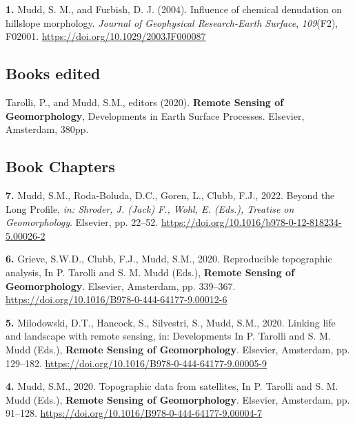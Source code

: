 \documentclass[10pt, a4paper]{article}
\newcommand{\years}[1]{\marginnote{\scriptsize #1}}
\begin{document}
\years{2004}\hangindent=0.7cm\textbf{1. }Mudd, S. M., and Furbish, D. J. (2004). Influence of chemical denudation on hillslope morphology. \textit{Journal of Geophysical Research-Earth Surface}, \textit{109}(F2), F02001. \href{https://doi.org/10.1029/2003JF000087}{https://doi.org/10.1029/2003JF000087}\par


\subsection*{Books edited}
\years{2020}\hangindent=0.7cm Tarolli, P., and Mudd, S.M., editors (2020). \textbf{Remote Sensing of Geomorphology}, Developments in Earth Surface Processes. Elsevier, Amsterdam, 380pp.

\subsection*{Book Chapters}
\noindent
\years{2022}\hangindent=0.7cm\textbf{7. }Mudd, S.M., Roda-Boluda, D.C., Goren, L., Clubb, F.J., 2022. Beyond the Long Profile, \textit{in: Shroder, J. (Jack) F., Wohl, E. (Eds.), Treatise on Geomorphology}. Elsevier, pp. 22–52. \href{https://doi.org/10.1016/b978-0-12-818234-5.00026-2}{https://doi.org/10.1016/b978-0-12-818234-5.00026-2}\par

\years{2020}\hangindent=0.7cm\textbf{6. }Grieve, S.W.D., Clubb, F.J., Mudd, S.M., 2020. Reproducible topographic analysis, In P. Tarolli and S. M. Mudd (Eds.), \textbf{Remote Sensing of Geomorphology}. Elsevier, Amsterdam, pp. 339–367. \href{https://doi.org/10.1016/B978-0-444-64177-9.00012-6}{https://doi.org/10.1016/B978-0-444-64177-9.00012-6}\par

\years{2020}\hangindent=0.7cm\textbf{5. }Milodowski, D.T., Hancock, S., Silvestri, S., Mudd, S.M., 2020. Linking life and landscape with remote sensing, in: Developments In P. Tarolli and S. M. Mudd (Eds.), \textbf{Remote Sensing of Geomorphology}. Elsevier, Amsterdam, pp. 129–182. \href{https://doi.org/10.1016/B978-0-444-64177-9.00005-9}{https://doi.org/10.1016/B978-0-444-64177-9.00005-9}\par

\years{2020}\hangindent=0.7cm\textbf{4. }Mudd, S.M., 2020. Topographic data from satellites, In P. Tarolli and S. M. Mudd (Eds.), \textbf{Remote Sensing of Geomorphology}. Elsevier, Amsterdam, pp. 91–128. \href{https://doi.org/10.1016/B978-0-444-64177-9.00004-7}{https://doi.org/10.1016/B978-0-444-64177-9.00004-7}\par
\end{document}
